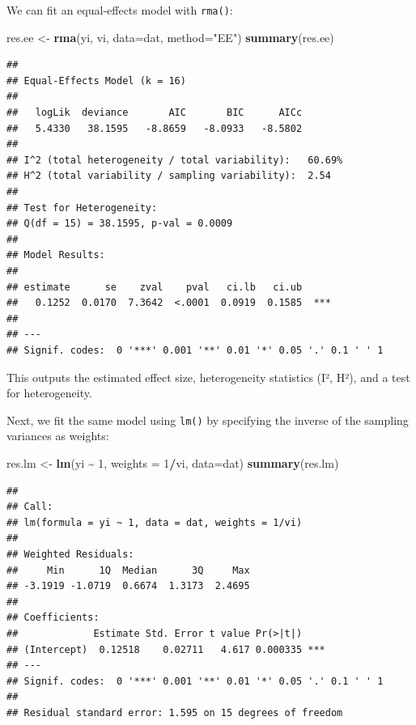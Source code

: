 \documentclass[
]{book}
\newenvironment{Shaded}{\begin{snugshade}}{\end{snugshade}}
\newcommand{\AttributeTok}[1]{\textcolor[rgb]{0.13,0.29,0.53}{#1}}
\newcommand{\DecValTok}[1]{\textcolor[rgb]{0.00,0.00,0.81}{#1}}
\newcommand{\FunctionTok}[1]{\textcolor[rgb]{0.13,0.29,0.53}{\textbf{#1}}}
\newcommand{\NormalTok}[1]{#1}
\newcommand{\OtherTok}[1]{\textcolor[rgb]{0.56,0.35,0.01}{#1}}
\newcommand{\SpecialCharTok}[1]{\textcolor[rgb]{0.81,0.36,0.00}{\textbf{#1}}}
\newcommand{\StringTok}[1]{\textcolor[rgb]{0.31,0.60,0.02}{#1}}
\begin{document}
We can fit an equal-effects model with \texttt{rma()}:

\begin{Shaded}
\begin{Highlighting}[]
\NormalTok{res.ee }\OtherTok{\textless{}{-}} \FunctionTok{rma}\NormalTok{(yi, vi, }\AttributeTok{data=}\NormalTok{dat, }\AttributeTok{method=}\StringTok{"EE"}\NormalTok{)}
\FunctionTok{summary}\NormalTok{(res.ee)}
\end{Highlighting}
\end{Shaded}

\begin{verbatim}
## 
## Equal-Effects Model (k = 16)
## 
##   logLik  deviance       AIC       BIC      AICc   
##   5.4330   38.1595   -8.8659   -8.0933   -8.5802   
## 
## I^2 (total heterogeneity / total variability):   60.69%
## H^2 (total variability / sampling variability):  2.54
## 
## Test for Heterogeneity:
## Q(df = 15) = 38.1595, p-val = 0.0009
## 
## Model Results:
## 
## estimate      se    zval    pval   ci.lb   ci.ub      
##   0.1252  0.0170  7.3642  <.0001  0.0919  0.1585  *** 
## 
## ---
## Signif. codes:  0 '***' 0.001 '**' 0.01 '*' 0.05 '.' 0.1 ' ' 1
\end{verbatim}

This outputs the estimated effect size, heterogeneity statistics (I², H²), and a test for heterogeneity.

Next, we fit the same model using \texttt{lm()} by specifying the inverse of the sampling variances as weights:

\begin{Shaded}
\begin{Highlighting}[]
\NormalTok{res.lm }\OtherTok{\textless{}{-}} \FunctionTok{lm}\NormalTok{(yi }\SpecialCharTok{\textasciitilde{}} \DecValTok{1}\NormalTok{, }\AttributeTok{weights =} \DecValTok{1}\SpecialCharTok{/}\NormalTok{vi, }\AttributeTok{data=}\NormalTok{dat)}
\FunctionTok{summary}\NormalTok{(res.lm)}
\end{Highlighting}
\end{Shaded}

\begin{verbatim}
## 
## Call:
## lm(formula = yi ~ 1, data = dat, weights = 1/vi)
## 
## Weighted Residuals:
##     Min      1Q  Median      3Q     Max 
## -3.1919 -1.0719  0.6674  1.3173  2.4695 
## 
## Coefficients:
##             Estimate Std. Error t value Pr(>|t|)    
## (Intercept)  0.12518    0.02711   4.617 0.000335 ***
## ---
## Signif. codes:  0 '***' 0.001 '**' 0.01 '*' 0.05 '.' 0.1 ' ' 1
## 
## Residual standard error: 1.595 on 15 degrees of freedom
\end{verbatim}
\end{document}
